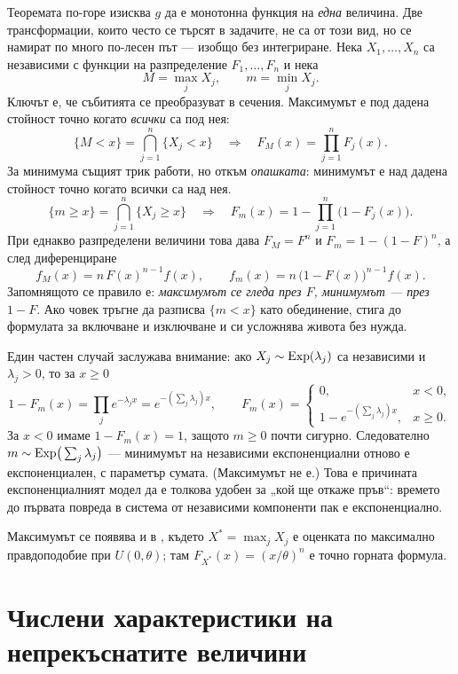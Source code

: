 \begin{supp}\label{supp:max-min}
Теоремата по-горе изисква $g$ да е монотонна функция на \emph{една} величина. Две
трансформации, които често се търсят в задачите, не са от този вид, но се намират по
много по-лесен път — изобщо без интегриране. Нека $X_1, \dots, X_n$ са независими с
функции на разпределение $F_1, \dots, F_n$ и нека
\[ M = \max_j X_j, \qquad m = \min_j X_j . \]
Ключът е, че събитията се преобразуват в сечения. Максимумът е под дадена стойност точно
когато \emph{всички} са под нея:
\[
  \{M < x\} = \bigcap_{j=1}^{n} \{X_j < x\}
  \quad\Longrightarrow\quad
  F_M(x) = \prod_{j=1}^{n} F_j(x) .
\]
За минимума същият трик работи, но откъм \emph{опашката}: минимумът е над дадена стойност
точно когато всички са над нея.
\[
  \{m \ge x\} = \bigcap_{j=1}^{n} \{X_j \ge x\}
  \quad\Longrightarrow\quad
  F_m(x) = 1 - \prod_{j=1}^{n}\big(1 - F_j(x)\big) .
\]
При еднакво разпределени величини това дава $F_M = F^n$ и $F_m = 1-(1-F)^n$, а след
диференциране
\[
  f_M(x) = n\,F(x)^{n-1} f(x), \qquad f_m(x) = n\,\big(1-F(x)\big)^{n-1} f(x) .
\]
Запомнящото се правило е: \emph{максимумът се гледа през $F$, минимумът — през $1-F$}.
Ако човек тръгне да разписва $\{m < x\}$ като обединение, стига до формулата за включване
и изключване и си усложнява живота без нужда.

Един частен случай заслужава внимание: ако $X_j \sim \operatorname{Exp}(\lambda_j)$ са
независими и $\lambda_j>0$, то за $x\ge0$
\[
1-F_m(x)=\prod_j e^{-\lambda_j x}=e^{-(\sum_j\lambda_j)x},
\qquad
F_m(x)=\begin{cases}0,&x<0,\\ 1-e^{-(\sum_j\lambda_j)x},&x\ge0.
\end{cases}
\]
За $x<0$ имаме $1-F_m(x)=1$, защото $m\ge0$ почти сигурно. Следователно
$m \sim \operatorname{Exp}\!\big(\sum_j \lambda_j\big)$ — минимумът на независими
експоненциални отново е експоненциален, с параметър сумата. (Максимумът не е.) Това е
причината експоненциалният модел да е толкова удобен за „кой ще откаже пръв“: времето до
първата повреда в система от независими компоненти пак е експоненциално.

Максимумът се появява и в , където
$X^* = \max_j X_j$ е оценката по максимално правдоподобие при $U(0,\theta)$; там
$F_{X^*}(x) = (x/\theta)^n$ е точно горната формула.
\end{supp}

\section{Числени характеристики на непрекъснатите величини}

